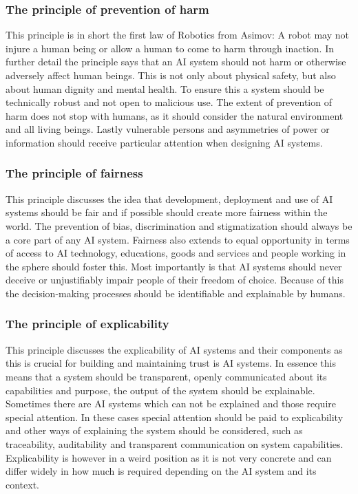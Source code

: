 \subsubsection*{The principle of prevention of harm}
This principle is in short the first law of Robotics from Asimov: A robot may not injure a human being or allow a human to come to harm through inaction. In further detail the principle says that an AI system should not harm or otherwise adversely affect human beings. This is not only about physical safety, but also about human dignity and mental health. To ensure this a system should be technically robust and not open to malicious use. The extent of prevention of harm does not stop with humans, as it should consider the natural environment and all living beings. Lastly vulnerable persons and asymmetries of power or information should receive particular attention when designing AI systems.

\subsubsection*{The principle of fairness}
This principle discusses the idea that development, deployment and use of AI systems should be fair and if possible should create more fairness within the world. The prevention of bias, discrimination and stigmatization should always be a core part of any AI system. Fairness also extends to equal opportunity in terms of access to AI technology, educations, goods and services and people working in the sphere should foster this. Most importantly is that AI systems should never deceive or unjustifiably impair people of their freedom of choice. Because of this the decision-making processes should be identifiable and explainable by humans.

\subsubsection*{The principle of explicability}
This principle discusses the explicability of AI systems and their components as this is crucial for building and maintaining trust is AI systems. In essence this means that a system should be transparent, openly communicated about its capabilities and purpose, the output of the system should be explainable.  Sometimes there are AI systems which can not be explained and those require special attention. In these cases special attention should be paid to explicability and other ways of explaining the system should be considered, such as traceability, auditability and transparent communication on system capabilities. Explicability is however in a weird position as it is not very concrete and can differ widely in how much is required depending on the AI system and its context.

